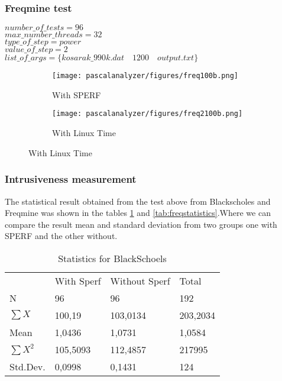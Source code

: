 \subsubsection{Freqmine test}

$number\_of\_tests=96$\\
$max\_number\_threads=32$\\
$type\_of\_step=power$\\
$value\_of\_step=2$\\
$list\_of\_args=\{kosarak\_990k.dat \quad 1200 \quad output.txt\}$

\begin{figure}[H]
	\centering
	\begin{subfigure}[b]{0.45\textwidth}
		\texttt{[image: pascalanalyzer/figures/freq100b.png]}
		\caption{With SPERF}
		\label{fig:freq100b}
	\end{subfigure}
	\begin{subfigure}[b]{0.45\textwidth}
		\texttt{[image: pascalanalyzer/figures/freq2100b.png]}
		\caption{With Linux Time}
		\label{fig:freq2100b}
	\end{subfigure}
\end{figure}


\subsubsection{Intrusiveness measurement}

The statistical result obtained from the test above from Blackscholes and Freqmine was shown in the tables \ref{tab:blackstatistics} and \ref{tab:freqstatistics}.Where we can compare the result mean and standard deviation from two groups one with SPERF and the other without.

\begin{table}[H]
	\centering
	\caption{Statistics for BlackSchoels}
	\label{tab:blackstatistics}
	\begin{tabular}{llll}
		& With Sperf & Without Sperf & Total    \\
		N               & 96         & 96            & 192      \\
		$\sum{X}$       & 100,19     & 103,0134      & 203,2034 \\
		Mean            & 1,0436     & 1,0731        & 1,0584   \\
		$\sum{X^2}$     & 105,5093   & 112,4857      & 217995   \\
		Std.Dev.        & 0,0998     & 0,1431        & 124     
	\end{tabular}
\end{table}

